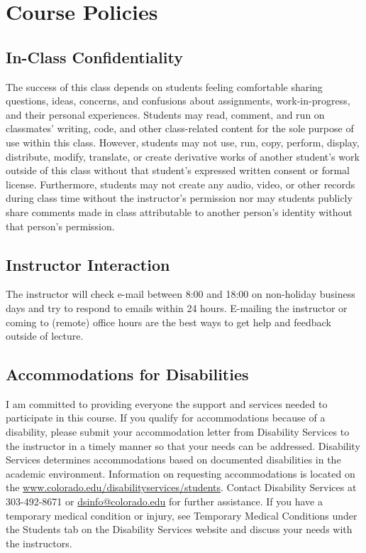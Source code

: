 \documentclass[10pt]{memoir}
\begin{document}
\clearpage


\section{\textbf{Course Policies}}


\subsection{In-Class Confidentiality}
The success of this class depends on students feeling comfortable sharing questions, ideas, concerns, and confusions about assignments, work-in-progress, and their personal experiences. Students may read, comment, and run on classmates' writing, code, and other class-related content for the sole purpose of use within this class. However, students may not use, run, copy, perform, display, distribute, modify, translate, or create derivative works of another student's work outside of this class without that student's expressed written consent or formal license. Furthermore, students may not create any audio, video, or other records during class time without the instructor's permission nor may students publicly share comments made in class attributable to another person's identity without that person's permission.

\subsection{Instructor Interaction}
The instructor will check e-mail between 8:00 and 18:00 on non-holiday business days and try to respond to emails within 24 hours. E-mailing the instructor or coming to (remote) office hours are the best ways to get help and feedback outside of lecture.

\subsection{Accommodations for Disabilities}
I am committed to providing everyone the support and services needed to participate in this course. If you qualify for accommodations because of a disability, please submit your accommodation letter from Disability Services to the instructor in a timely manner so that your needs can be addressed. Disability Services determines accommodations based on documented disabilities in the academic environment. Information on requesting accommodations is located on the \href{Disability Services website}{www.colorado.edu/disabilityservices/students}. Contact Disability Services at 303-492-8671 or \href{mailto:dsinfo@colorado.edu}{dsinfo@colorado.edu} for further assistance. If you have a temporary medical condition or injury, see Temporary Medical Conditions under the Students tab on the Disability Services website and discuss your needs with the instructors.
\end{document}
